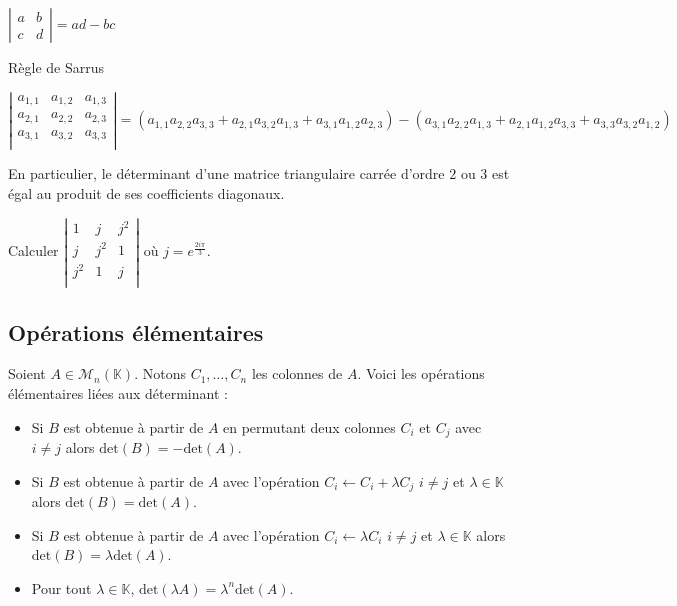 \documentclass[a4paper,10pt]{report}
\begin{document}
\begin{Proposition}{} $\left\vert \begin{array}{cc}
a & b \\
c & d
\end{array} \right\vert = ad-bc$
\end{Proposition}

\begin{Proposition}{Règle de Sarrus}

$$\left\vert \begin{array}{ccc}
a_{1,1} & a_{1,2} & a_{1,3} \\
a_{2,1} & a_{2,2} & a_{2,3} \\
a_{3,1} & a_{3,2} & a_{3,3} \\
\end{array} \right\vert =  (a_{1,1}a_{2,2} a_{3,3} +  a_{2,1}a_{3,2}a_{1,3} + a_{3,1}a_{1,2}a_{2,3}) - (a_{3,1}a_{2,2}a_{1,3} + a_{2,1} a_{1,2} a_{3,3} + a_{3,3} a_{3,2} a_{1,2} ) $$
\end{Proposition}

\begin{Remarque}{} En particulier, le déterminant d'une matrice triangulaire carrée d'ordre $2$ ou $3$ est égal au produit de ses coefficients diagonaux.
\end{Remarque}

\begin{ApplicationDirecte} Calculer $\left\vert \begin{array}{ccc}
1 & j & j^2 \\
j & j^2& 1 \\
j^2 & 1 & j \\
\end{array}\right\vert$ où $j=e^{\frac{2i\pi}{3}}$.
\end{ApplicationDirecte}

\subsection{Opérations élémentaires}

Soient $A \in \mathcal{M}_n(\mathbb{K})$. Notons $C_1, \ldots, C_n$ les colonnes de $A$. Voici les opérations élémentaires liées aux déterminant :

\begin{itemize}
\item Si $B$ est obtenue à partir de $A$ en permutant deux colonnes $C_i$ et $C_j$ avec $i \neq j$ alors $\textrm{det}(B) = - \textrm{det}(A)$.
\item Si $B$ est obtenue à partir de $A$ avec l'opération $C_i \leftarrow C_i + \lambda C_j$ $i \neq j$ et $\lambda \in \mathbb{K}$ alors $\textrm{det}(B) = \textrm{det}(A)$.
\item Si $B$ est obtenue à partir de $A$ avec l'opération $C_i \leftarrow \lambda C_i$ $i \neq j$ et $\lambda \in \mathbb{K}$ alors $\textrm{det}(B) = \lambda\textrm{det}(A)$.
\item Pour tout $\lambda \in \mathbb{K}$, $\textrm{det}(\lambda A) = \lambda^n \textrm{det}(A)$.
\end{itemize}
\end{document}
